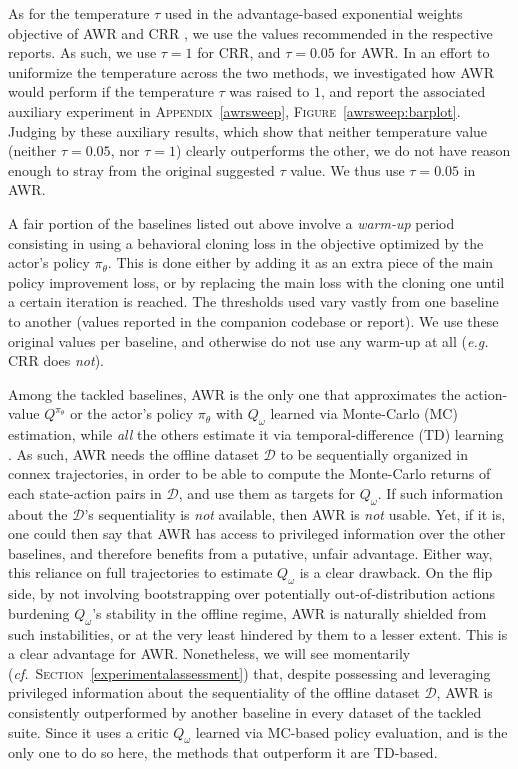 As for the temperature $\tau$ used in the advantage-based exponential weights objective of
AWR \cite{Peng2019-hu}
and CRR \cite{Wang2020-sr},
we use the values recommended in the respective reports.
As such, we use $\tau = 1$ for CRR, and $\tau = 0.05$ for AWR.
In an effort to uniformize the temperature across the two methods, we investigated how AWR would perform
if the temperature $\tau$ was raised to $1$, and report the associated auxiliary experiment in
\textsc{Appendix}~\ref{awrsweep}, \textsc{Figure}~\ref{awrsweep:barplot}.
Judging by these auxiliary results, which show that neither temperature value
(neither $\tau = 0.05$, nor $\tau = 1$)
clearly outperforms the other,
we do not have reason enough to stray from the original suggested $\tau$ value.
We thus use $\tau = 0.05$ in AWR.

A fair portion of the baselines listed out above involve a \emph{warm-up} period consisting in using
a behavioral cloning loss in the objective optimized by the actor's policy $\pi_\theta$. This is done
either by adding it as an extra piece of the main policy improvement loss, or by replacing the main loss
with the cloning one until a certain iteration is reached.
The thresholds used vary vastly from one baseline to another (values reported in the companion codebase or report).
We use these original values per baseline,
and otherwise do not use any warm-up at all
(\textit{e.g.} CRR \cite{Wang2020-sr} does \emph{not}).

Among the tackled baselines, AWR \cite{Peng2019-hu}
is the only one that approximates the action-value $Q^{\pi_\theta}$ or the actor's policy $\pi_\theta$
with $Q_\omega$ learned via Monte-Carlo (MC) estimation, while \emph{all} the others estimate it via
temporal-difference (TD) learning \cite{Sutton1984-ce, Sutton1988-to, Sutton1999-ii}.
As such, AWR needs the offline dataset $\mathcal{D}$ to be sequentially organized in connex trajectories, in
order to be able to compute the Monte-Carlo returns of each state-action pairs in $\mathcal{D}$,
and use them as targets for $Q_\omega$.
If such information about the $\mathcal{D}$'s sequentiality is \emph{not} available, then AWR is \emph{not} usable.
Yet, if it is, one could then say that AWR has access to privileged information over the other baselines, and
therefore benefits from a putative, unfair advantage.
Either way, this reliance on full trajectories to estimate $Q_\omega$ is a clear drawback.
On the flip side, by not involving bootstrapping over potentially out-of-distribution actions
burdening $Q_\omega$'s stability in the offline regime, AWR is naturally shielded from such instabilities,
or at the very least hindered by them to a lesser extent.
This is a clear advantage for AWR.
Nonetheless, we will see momentarily (\textit{cf.}~\textsc{Section}~\ref{experimentalassessment})
that, despite possessing and leveraging privileged information about the sequentiality
of the offline dataset $\mathcal{D}$,
AWR is consistently outperformed by another baseline in every dataset of the tackled suite.
Since it uses a critic $Q_\omega$ learned via MC-based policy evaluation, and is the only one to do so here,
the methods that outperform it are TD-based.

